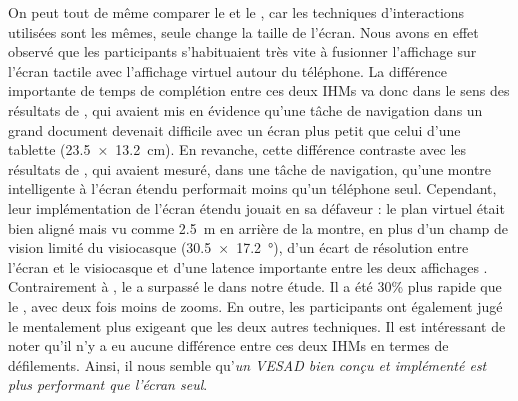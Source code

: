 On peut tout de même comparer le  et le , car les techniques d'interactions utilisées sont les mêmes, seule change la taille de l'écran. Nous avons en effet observé que les participants s'habituaient très vite à fusionner l'affichage sur l'écran tactile avec l'affichage virtuel autour du téléphone. La différence importante de temps de complétion entre ces deux IHMs va donc dans le sens des résultats de \cite{Raedle2014}, qui avaient mis en évidence qu'une tâche de navigation dans un grand document devenait difficile avec un écran plus petit que celui d'une tablette (\SI{23.5x13.2}{\cm}). En revanche, cette différence contraste avec les résultats de \cite{Grubert2015}, qui avaient mesuré, dans une tâche de navigation, qu'une montre intelligente à l'écran étendu performait moins qu'un téléphone seul. Cependant, leur implémentation de l'écran étendu jouait en sa défaveur : le plan virtuel était bien aligné mais vu comme \SI{2.5}{\m} en arrière de la montre, en plus d'un champ de vision limité du visiocasque (\SI{30.5x17.2}{\degree}), d'un écart de résolution entre l'écran et le visiocasque et d'une latence importante entre les deux affichages . Contrairement à \citeauthor{Grubert2015}, le  a surpassé le  dans notre étude. Il a été 30\% plus rapide que le , avec deux fois moins de zooms. En outre, les participants ont également jugé le  mentalement plus exigeant que les deux autres techniques. Il est intéressant de noter qu'il n'y a eu aucune différence entre ces deux IHMs en termes de défilements. Ainsi, il nous semble qu'\emph{un VESAD bien conçu et implémenté est plus performant que l'écran seul}.



